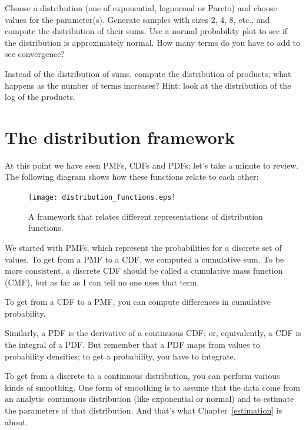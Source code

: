 \documentclass[12pt]{book}
\begin{document}
\begin{ex}

Choose a distribution (one of exponential, lognormal or Pareto) and
choose values for the parameter(s).  Generate samples with sizes
2, 4, 8, etc., and compute the distribution of their sums.  Use
a normal probability plot to see if the distribution is approximately
normal.  How many terms do you have to add to see convergence?

\end{ex}


\begin{ex}

Instead of the distribution of sums, compute the distribution of
products; what happens as the number of terms increases?
Hint: look at the distribution of the log of the products.

\end{ex}

\section{The distribution framework}

At this point we have seen PMFs, CDFs and PDFs; let's take a minute
to review.  The following diagram shows how these functions relate
to each other:

\begin{figure}
\centerline{\texttt{[image: distribution\_functions.eps]}}
\caption{A framework that relates different representations of distribution
functions.}
\label{dist_func}
\end{figure}

We started with PMFs, which represent the probabilities for a discrete
set of values.  To get from a PMF to a CDF, we computed a cumulative sum.
To be more consistent, a discrete CDF should be called a cumulative mass
function (CMF), but as far as I can tell no one uses that term.

To get from a CDF to a PMF, you can compute differences in cumulative
probability.

Similarly, a PDF is the derivative of a continuous CDF; or, equivalently,
a CDF is the integral of a PDF.  But remember that a PDF maps from
values to probability densities; to get a probability, you have to
integrate.

To get from a discrete to a continuous distribution, you can perform
various kinds of smoothing.  One form of smoothing is to assume that
the data come from an analytic continuous distribution
(like exponential or normal) and to estimate the parameters of that
distribution.  And that's what Chapter~\ref{estimation} is about.
\end{document}
